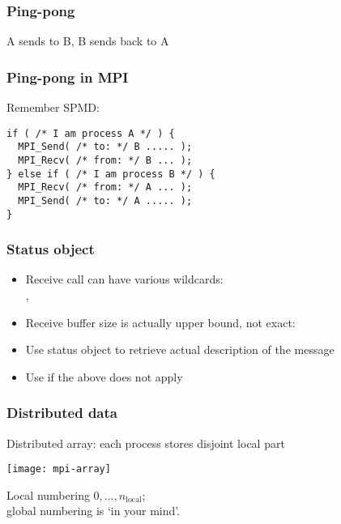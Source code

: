 \begin{frame}\frametitle{Ping-pong}
  A sends to B, B sends back to A

\end{frame}

\begin{frame}[containsverbatim]\frametitle{Ping-pong in MPI}
Remember SPMD:
\lstset{language=C}
\begin{lstlisting}
if ( /* I am process A */ ) {
  MPI_Send( /* to: */ B ..... );
  MPI_Recv( /* from: */ B ... );
} else if ( /* I am process B */ ) {
  MPI_Recv( /* from: */ A ... );
  MPI_Send( /* to: */ A ..... );
}
\end{lstlisting}
\end{frame}


\begin{frame}[containsverbatim]\frametitle{Status object}
  \begin{itemize}
  \item Receive call can have various wildcards:\\
    , 
  \item Receive buffer size is actually upper bound, not exact:
  \item Use status object to retrieve actual description of the message
  \item Use  if the above does not apply
  \end{itemize}
\end{frame}

\begin{exerciseframe}[pingpong]
  
\end{exerciseframe}



\begin{frame}[containsverbatim]\frametitle{Distributed data}
  Distributed array: each process stores disjoint local part
  
  \texttt{[image: mpi-array]}

  Local numbering $0,\ldots,n_{\mathrm{local}}$;\\
  global numbering is `in your mind'.
\end{frame}

